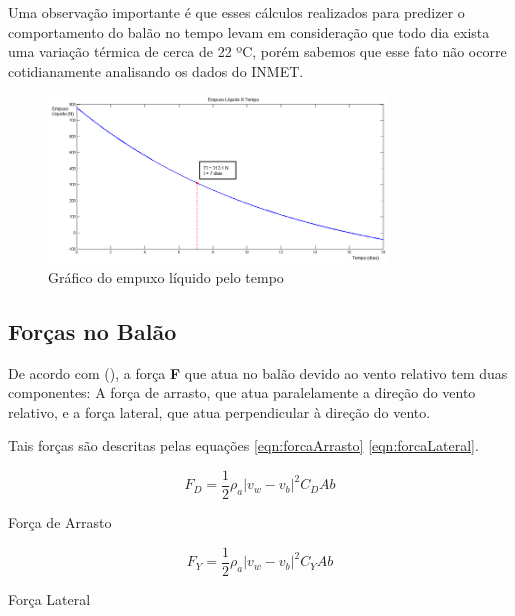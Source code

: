 	Uma observação importante é que esses cálculos realizados para predizer o comportamento do balão no tempo levam em consideração que todo dia exista uma variação térmica de cerca de 22 ºC, porém sabemos que esse fato não ocorre cotidianamente analisando os dados do INMET.

	\begin{figure}[H]
		\centering
		\includegraphics[width=0.8\textwidth]{figuras/empuxoLiquidoTempo}
		\caption{Gráfico do empuxo líquido pelo tempo}
		\label{img:empuxoLiquidoTempo}
	\end{figure}

\subsection{Forças no Balão} %
\label{sub:for_as_no_bal_o}

De acordo com  (\citeyear{yajima}), a força \textbf{F} que atua no balão devido ao vento relativo tem duas componentes: A força de arrasto, que atua paralelamente a direção do vento relativo, e a força lateral, que atua perpendicular à direção do vento.

Tais forças são descritas pelas equações \eqref{eqn:forcaArrasto} \eqref{eqn:forcaLateral}.

	\begin{equacao}
		\begin{equation}
			F_{D} = \frac{1}{2} \rho_{a} \left | v_{w} - v_{b} \right |^{2} C_{D}A{b}
		\end{equation}
		\caption[Força de arrasto]{Força de Arrasto~\cite{yajima}}
		\label{eqn:forcaArrasto}
	\end{equacao}

	\begin{equacao}
		\begin{equation}
			F_{Y} = \frac{1}{2} \rho_{a} \left | v_{w} - v_{b} \right |^{2} C_{Y}A{b}
		\end{equation}
		\caption[Força lateral]{Força Lateral~\cite{yajima}}
		\label{eqn:forcaLateral}
	\end{equacao}

